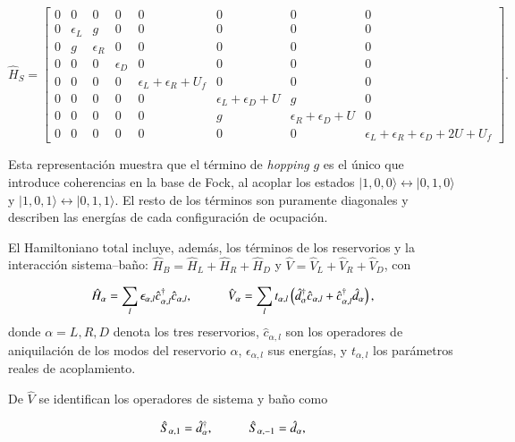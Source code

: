 \begin{equation*}
    \hat{H}_{S} = 
    \begin{bmatrix}
        0 & 0 & 0 & 0 & 0 & 0 & 0 & 0 \\
        0 & \epsilon_{L} & g & 0 & 0 & 0 & 0 & 0 \\
        0 & g & \epsilon_{R} & 0 & 0 & 0 & 0 & 0 \\
        0 & 0 & 0 & \epsilon_{D} & 0 & 0 & 0 & 0 \\
        0 & 0 & 0 & 0 & \epsilon_{L} + \epsilon_{R}  + U_{f} & 0 & 0 & 0 \\
        0 & 0 & 0 & 0 & 0 & \epsilon_{L} + \epsilon_{D} + U & g & 0 \\
        0 & 0 & 0 & 0 & 0 & g & \epsilon_{R} + \epsilon_{D} + U & 0 \\
        0 & 0 & 0 & 0 & 0 & 0 & 0 & \epsilon_{L} + \epsilon_{R}  + \epsilon_{D} + 2U + U_{f} 
        \end{bmatrix}.
\end{equation*}

Esta representación muestra que el término de \textit{hopping} $g$ es el único que introduce coherencias en la base de Fock, al acoplar los estados $|1,0,0\rangle \leftrightarrow |0,1,0\rangle$ y $|1,0,1\rangle \leftrightarrow |0,1,1\rangle$. El resto de los términos son puramente diagonales y describen las energías de cada configuración de ocupación.

El Hamiltoniano total incluye, además, los términos de los reservorios y la interacción sistema–baño: $\hat{H}_{B} = \hat{H}_{L}+\hat{H}_{R}+\hat{H}_{D}$ y $\hat{V} = \hat{V}_{L}+\hat{V}_{R}+\hat{V}_{D}$, con 

\begin{equation*}
    \hat{H}_{\alpha} = \sum_{l} \epsilon_{\alpha, l} \hat{c}^{\dagger}_{\alpha, l}\hat{c}_{\alpha, l}, \hspace{10mm} 
    \hat{V}_{\alpha} = \sum_{l} t_{\alpha, l} \left( \hat{d}^{\dagger}_{\alpha} \hat{c}_{\alpha, l} + \hat{c}^{\dagger}_{\alpha, l} \hat{d}_{\alpha} \right),
\end{equation*}
donde $\alpha = L,R,D$ denota los tres reservorios, $\hat{c}_{\alpha,l}$ son los operadores de aniquilación de los modos del reservorio $\alpha$, $\epsilon_{\alpha, l}$ sus energías, y $t_{\alpha, l}$ los parámetros reales de acoplamiento. 

De $\hat{V}$ se identifican los operadores de sistema y baño como 

\begin{equation*}
    \hat{S}_{\alpha,1} = \hat{d}^{\dagger}_{\alpha}, \hspace{10mm} \hat{S}_{\alpha,-1} = \hat{d}_{\alpha},
\end{equation*}

